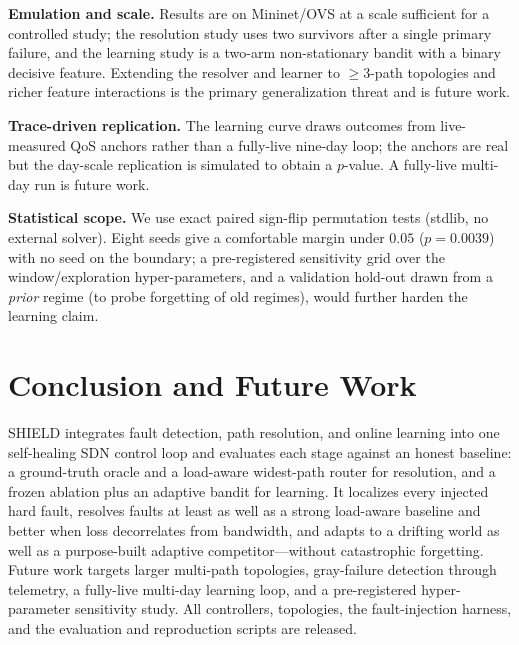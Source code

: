 \documentclass[conference]{IEEEtran}
\begin{document}
\textbf{Emulation and scale.} Results are on Mininet/OVS at a scale sufficient for a
controlled study; the resolution study uses two survivors after a single primary
failure, and the learning study is a two-arm non-stationary bandit with a binary
decisive feature. Extending the resolver and learner to $\geq3$-path topologies and
richer feature interactions is the primary generalization threat and is future work.

\textbf{Trace-driven replication.} The learning curve draws outcomes from
live-measured QoS anchors rather than a fully-live nine-day loop; the anchors are
real but the day-scale replication is simulated to obtain a $p$-value. A fully-live
multi-day run is future work.

\textbf{Statistical scope.} We use exact paired sign-flip permutation tests
(stdlib, no external solver). Eight seeds give a comfortable margin under $0.05$
($p=0.0039$) with no seed on the boundary; a pre-registered sensitivity grid over the
window/exploration hyper-parameters, and a validation hold-out drawn from a
\emph{prior} regime (to probe forgetting of old regimes), would further harden the
learning claim.

\section{Conclusion and Future Work}
SHIELD integrates fault detection, path resolution, and online learning into one
self-healing SDN control loop and evaluates each stage against an honest baseline: a
ground-truth oracle and a load-aware widest-path router for resolution, and a frozen
ablation plus an adaptive bandit for learning. It localizes every injected hard
fault, resolves faults at least as well as a strong load-aware baseline and better
when loss decorrelates from bandwidth, and adapts to a drifting world as well as a
purpose-built adaptive competitor---without catastrophic forgetting. Future work
targets larger multi-path topologies, gray-failure detection through telemetry,
a fully-live multi-day learning loop, and a pre-registered hyper-parameter
sensitivity study. All controllers, topologies, the fault-injection harness, and
the evaluation and reproduction scripts are released.



\end{document}
